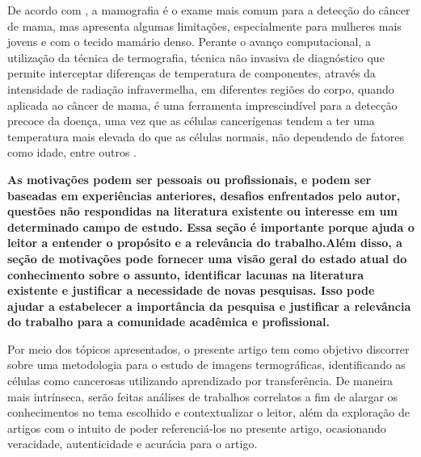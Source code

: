 De acordo com , a mamografia é o exame mais comum para a detecção do câncer de mama, mas apresenta algumas limitações, especialmente para mulheres mais jovens e com o tecido mamário denso. Perante o avanço computacional, a utilização da técnica de termografia, técnica não invasiva de diagnóstico que permite interceptar diferenças de temperatura de componentes, através da intensidade de radiação infravermelha, em diferentes regiões do corpo, quando aplicada ao câncer de mama, é uma ferramenta imprescindível para a detecção precoce da doença, uma vez que as células cancerígenas tendem a ter uma temperatura mais elevada do que as células normais, não dependendo de fatores como idade, entre outros \cite{leles}.

\textbf{As motivações podem ser pessoais ou profissionais, e podem ser baseadas em experiências anteriores, desafios enfrentados  pelo autor, questões não respondidas na literatura existente ou interesse em um determinado campo de estudo. Essa seção é  importante porque ajuda o leitor a entender o propósito e a relevância do trabalho.Além disso, a seção de motivações pode fornecer uma visão geral do estado atual do conhecimento sobre o assunto, identificar lacunas na literatura existente e justificar a necessidade de novas pesquisas. Isso pode ajudar a estabelecer a importância da pesquisa e justificar a relevância do trabalho para a comunidade acadêmica e profissional.}

Por meio dos tópicos apresentados, o presente artigo tem como objetivo discorrer sobre uma metodologia para o estudo de imagens termográficas, identificando as células como cancerosas utilizando aprendizado por transferência. De maneira mais intrínseca, serão feitas análises de trabalhos correlatos a fim de alargar os conhecimentos no tema escolhido e contextualizar o leitor, além da exploração de artigos com o intuito de poder referenciá-los no presente artigo, ocasionando veracidade, autenticidade e acurácia para o artigo.


